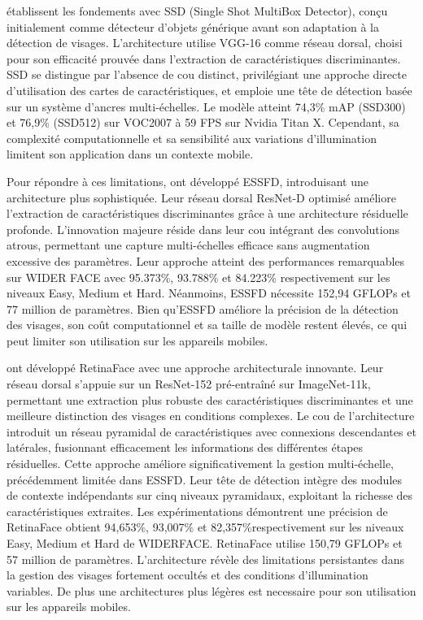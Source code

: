\begin{onehalfspace}
\hspace{0.65cm} \cite{Liu2015SSDSS}  établissent les fondements avec SSD (Single Shot MultiBox Detector), conçu initialement comme détecteur d'objets générique avant son adaptation à la détection de visages. L'architecture utilise VGG-16 comme réseau dorsal, choisi pour son efficacité prouvée dans l'extraction de caractéristiques discriminantes. SSD se distingue par l'absence de cou distinct, privilégiant une approche directe d'utilisation des cartes de caractéristiques, et emploie une tête de détection basée sur un système d'ancres multi-échelles. Le modèle atteint 74,3\% mAP (SSD300) et 76,9\% (SSD512) sur VOC2007 à 59 FPS sur Nvidia Titan X. Cependant, sa complexité computationnelle et sa sensibilité aux variations d'illumination limitent son application dans un contexte mobile.

\hspace{0.65cm} Pour répondre à ces limitations, \cite{Li2023SinglestageFD} ont développé ESSFD, introduisant une architecture plus sophistiquée. Leur réseau dorsal ResNet-D optimisé améliore l'extraction de caractéristiques discriminantes grâce à une architecture résiduelle profonde. L'innovation majeure réside dans leur cou intégrant des convolutions atrous, permettant une capture multi-échelles efficace sans augmentation excessive des paramètres. Leur approche atteint des performances remarquables sur WIDER FACE avec 95.373\%, 93.788\% et 84.223\% respectivement sur les niveaux Easy, Medium et Hard. Néanmoins, ESSFD nécessite 152,94 GFLOPs et 77 million de paramètres. Bien qu'ESSFD améliore la précision de la détection des visages, son coût computationnel et sa taille de modèle restent élevés, ce qui peut limiter son utilisation sur les appareils mobiles.

\hspace{0.65cm} \cite{Deng2019RetinaFaceSD} ont développé RetinaFace avec une approche architecturale innovante. Leur réseau dorsal s'appuie sur un ResNet-152 pré-entraîné sur ImageNet-11k, permettant une extraction plus robuste des caractéristiques discriminantes et une meilleure distinction des visages en conditions complexes. Le cou de l'architecture introduit un réseau pyramidal de caractéristiques avec connexions descendantes et latérales, fusionnant efficacement les informations des différentes étapes résiduelles. Cette approche améliore significativement la gestion multi-échelle, précédemment limitée dans ESSFD. Leur tête de détection intègre des modules de contexte indépendants sur cinq niveaux pyramidaux, exploitant la richesse des caractéristiques extraites. Les expérimentations démontrent une précision de RetinaFace obtient 94,653\%, 93,007\% et 82,357\%respectivement sur les niveaux Easy, Medium et Hard de WIDERFACE. RetinaFace utilise 150,79 GFLOPs et 57 million de paramètres. L'architecture révèle des limitations persistantes dans la gestion des visages fortement occultés et des conditions d'illumination variables. De plus une architectures plus légères est necessaire pour son utilisation sur les appareils mobiles.


\end{onehalfspace}
